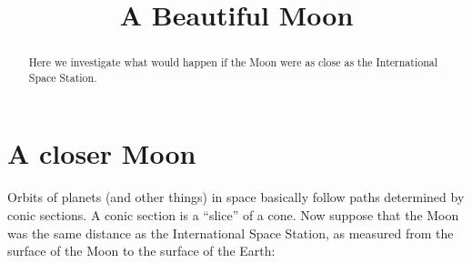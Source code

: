 \documentclass{ximera}
\title{A Beautiful Moon}
\begin{document}
\begin{abstract}
Here we investigate what would happen if the Moon were as close as the
International Space Station.
\end{abstract}
\maketitle

\section{A closer Moon}

Orbits of planets (and other things) in space basically follow paths
determined by conic sections. A conic section is a ``slice'' of a
cone. Now suppose that the Moon was the same distance as the International
Space Station, as measured from the surface of the Moon to the surface
of the Earth: 
\end{document}
